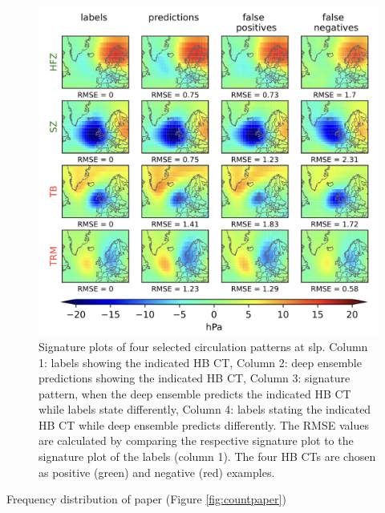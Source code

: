 \documentclass[
]{krantz}
\begin{document}
\begin{figure}

{\centering \includegraphics[width=0.7\linewidth]{work/01-weatherpattern/figures/paper/slp_signature_plots} 

}

\caption{Signature plots of four selected circulation patterns at slp. Column 1: labels showing the indicated HB CT, Column 2: deep ensemble predictions showing the indicated HB CT, Column 3: signature pattern, when the deep ensemble predicts the indicated HB CT while labels state differently, Column 4: labels stating the indicated HB CT while deep ensemble predicts differently. The RMSE values are calculated by comparing the respective signature plot to the signature plot of the labels (column 1). The four HB CTs are chosen as positive (green) and negative (red) examples.}\label{fig:sigpaper}
\end{figure}

Frequency distribution of paper (Figure \ref{fig:countpaper}) \citep{Mittermeier2022}
\end{document}
